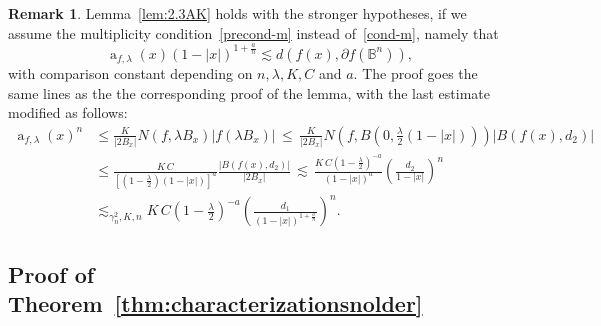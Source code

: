 \documentclass[11pt,a4paper,reqno]{amsart}
\theoremstyle{definition}
\newtheorem{remark}[theorem]{Remark}
\renewcommand{\a}{\operatorname{a}}
\newcommand{\B}{\mathbb{B}^n}
\numberwithin{komcounter}{section}
\begin{document}
\begin{remark}\label{rem-lem23-v2}
Lemma~\ref{lem:2.3AK} holds with the stronger hypotheses, if we assume the multiplicity condition~\eqref{precond-m} instead of~\eqref{cond-m}, namely that
 $$
	 \a_{f,\lambda} (x)(1-|x|)^{1+\frac{a}{n}}\lesssim d(f(x),\partial f(\B)),
$$
with comparison constant depending on $n,\lambda, K, C$ and $a$. The proof goes the same lines as the the corresponding proof of the lemma, with the last estimate modified as follows:
\begin{align*}
  \a_{f,\lambda }(x)^n & \leq \frac{K}{|2B_x|}N(f,\lambda B_x)|f(\lambda B_x)|\,\leq\, \frac{K}{|2B_x|}N\left(f,B\left(0,\tfrac{\lambda}{2} (1-|x|)\right)\right)|B(f(x),d_2)| \\
	&\leq\frac{K\, C}{\left[ \left(1-\frac{ \lambda}{2}\right)(1-|x|)\right]^a} \frac{|B(f(x), d_2)|}{|2B_x|}\,\lesssim\, \frac{K\, C\left( 1-\frac{\lambda}{2}\right)^{-a}}{ (1-|x|)^a} \left( \frac{d_2}{1-|x|}\right)^n\\
	&\lesssim_{\gamma_n^2, K, n}  K\, C\left( 1-\frac{\lambda}{2}\right)^{-a } \left( \frac{d_1}{(1-|x|)^{1+\frac{a}{n}}}\right)^n.
\end{align*}
\end{remark}

\subsection{Proof of Theorem~\ref{thm:characterizationsnolder}}\label{sect35}
\end{document}
